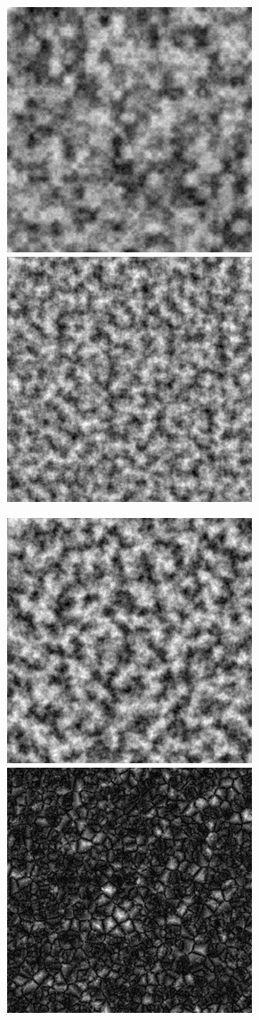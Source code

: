 \documentclass[a4paper]{article}
\begin{document}
    \begin{figure}[!h]
    \begin{center}
    \includegraphics[width=0.4\linewidth]{img/noise/value.png}
    \includegraphics[width=0.4\linewidth]{img/noise/perlin.png}
    \end{center}
    \begin{center}
    \includegraphics[width=0.4\linewidth]{img/noise/simplex.png}
     \includegraphics[width=0.4\linewidth]{img/noise/voronoi.png}

\end{center}
\end{figure}
\end{document}
